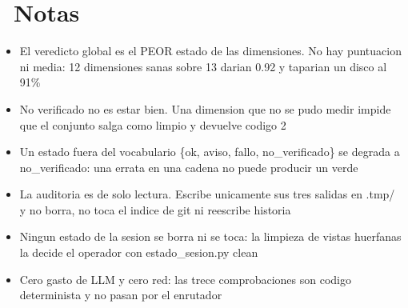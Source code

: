 \documentclass[11pt,a4paper]{article}
\newcommand{\iconotexto}[2]{\textcolor{cyanNeon}{\faIcon{#1}}~#2}
\begin{document}
\section{\iconotexto{sticky-note}{Notas}}
\begin{itemize}
\item El veredicto global es el PEOR estado de las dimensiones. No hay puntuacion ni media: 12 dimensiones sanas sobre 13 darian 0.92 y taparian un disco al 91\%
\item No verificado no es estar bien. Una dimension que no se pudo medir impide que el conjunto salga como limpio y devuelve codigo 2
\item Un estado fuera del vocabulario \{ok, aviso, fallo, no\_verificado\} se degrada a no\_verificado: una errata en una cadena no puede producir un verde
\item La auditoria es de solo lectura. Escribe unicamente sus tres salidas en .tmp/ y no borra, no toca el indice de git ni reescribe historia
\item Ningun estado de la sesion se borra ni se toca: la limpieza de vistas huerfanas la decide el operador con estado\_sesion.py clean
\item Cero gasto de LLM y cero red: las trece comprobaciones son codigo determinista y no pasan por el enrutador
\end{itemize}

\end{document}
